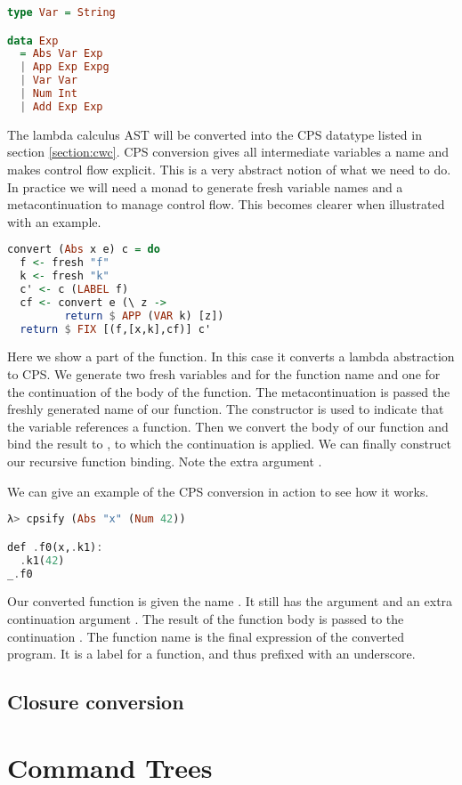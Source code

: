 \begin{lstlisting}[language=Haskell]
type Var = String

data Exp
  = Abs Var Exp
  | App Exp Expg
  | Var Var
  | Num Int
  | Add Exp Exp
\end{lstlisting}

The lambda calculus \ac{AST} will be converted into the \ac{CPS} datatype listed in section \ref{section:cwc}. \ac{CPS} conversion gives all intermediate variables a name and makes control flow explicit. This is a very abstract notion of what we need to do. In practice we will need a monad to generate fresh variable names and a metacontinuation to manage control flow. This becomes clearer when illustrated with an example.

\begin{lstlisting}[language=Haskell]
convert (Abs x e) c = do
  f <- fresh "f"
  k <- fresh "k"
  c' <- c (LABEL f)
  cf <- convert e (\ z ->
         return $ APP (VAR k) [z])
  return $ FIX [(f,[x,k],cf)] c'
\end{lstlisting}

Here we show a part of the  function. In this case it converts a lambda abstraction to \ac{CPS}. We generate two fresh variables  and  for the function name and one for the continuation of the body of the function. The metacontinuation  is passed the freshly generated name of our function. The  constructor is used to indicate that the variable references a function. Then we convert the body of our function and bind the result to , to which the continuation  is applied. We can finally construct our recursive function binding. Note the extra argument .

We can give an example of the \ac{CPS} conversion in action to see how it works.
\begin{lstlisting}[language=Haskell]
λ> cpsify (Abs "x" (Num 42))

def .f0(x,.k1):
  .k1(42)
_.f0
\end{lstlisting}

Our converted function is given the name . It still has the argument  and an extra continuation argument . The result of the function body is passed to the continuation . The function name is the final expression of the converted program. It is a label for a function, and thus prefixed with an underscore.

\subsection{\label{section:closconvert}Closure conversion}
\section{\label{section:comtree}Command Trees}